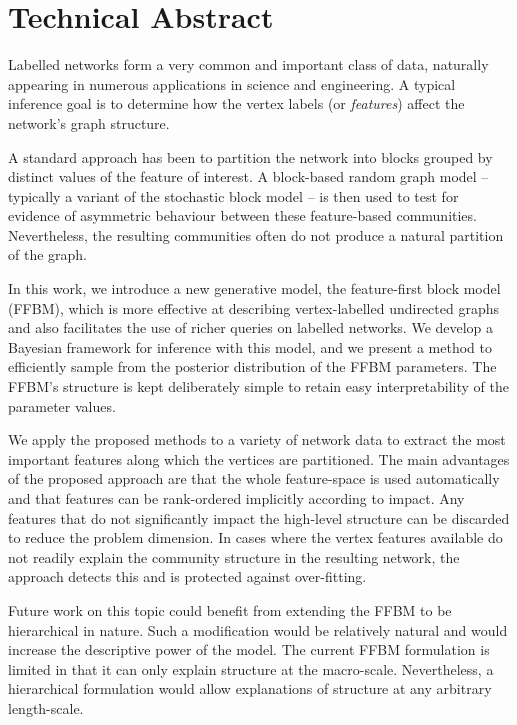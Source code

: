 \section*{Technical Abstract}
Labelled networks form a very common and important class of data,
naturally appearing in numerous applications in science and engineering.
A typical inference goal is to determine how the vertex labels
(or {\em features}) affect the network's graph structure.

A standard approach has been to partition the network into blocks grouped
by distinct values of the feature of interest. A block-based random
graph model -- typically a variant of the stochastic block model --
is then used to test for evidence of asymmetric behaviour between these
feature-based communities. Nevertheless, the resulting communities
often do not produce a natural partition of the graph.

In this work, we introduce a new generative model, the feature-first block model (FFBM),
which is more effective at describing vertex-labelled undirected
graphs and also facilitates the use of richer queries on labelled networks.
We develop a Bayesian framework for inference with this model,
and we present a method to efficiently sample from the posterior
distribution of the FFBM parameters. The FFBM's structure is kept
deliberately simple to retain easy interpretability of the parameter
values.

We apply the proposed methods to a variety of network data
to extract the most important features along which the vertices
are partitioned. The main advantages of the proposed approach are
that the whole feature-space is used automatically and that features
can be rank-ordered implicitly according to impact. Any features
that do not significantly impact the high-level structure can be
discarded to reduce the problem dimension. In cases where the vertex
features available do not readily explain the community structure
in the resulting network, the approach detects this and is protected
against over-fitting.

Future work on this topic could benefit from extending the FFBM to be hierarchical in nature. Such a modification would be relatively natural and would increase the descriptive power of the model. The current FFBM formulation is limited in that it can only explain structure at the macro-scale. Nevertheless, a hierarchical formulation would allow explanations of structure at any arbitrary length-scale.